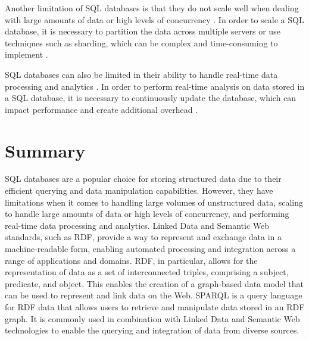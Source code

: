 Another limitation of SQL databases is that they do not scale well when dealing with large amounts of data or high levels of concurrency \citep{kleppmann2019designing,chen2014data}.  In order to scale a SQL database, it is necessary to partition the data across multiple servers or use techniques such as sharding, which can be complex and time-consuming to implement \citep{ramez2016fundamentals}.

SQL databases can also be limited in their ability to handle real-time data processing and analytics \citep{kleppmann2019designing,chen2014data}.  In order to perform real-time analysis on data stored in a SQL database, it is necessary to continuously update the database, which can impact performance and create additional overhead \citep{garcia2008database}.

\section{Summary}

SQL databases are a popular choice for storing structured data due to their efficient querying and data manipulation capabilities.  However, they have limitations when it comes to handling large volumes of unstructured data, scaling to handle large amounts of data or high levels of concurrency, and performing real-time data processing and analytics.  Linked Data and Semantic Web standards, such as RDF, provide a way to represent and exchange data in a machine-readable form, enabling automated processing and integration across a range of applications and domains.  RDF, in particular, allows for the representation of data as a set of interconnected triples, comprising a subject, predicate, and object.  This enables the creation of a graph-based data model that can be used to represent and link data on the Web.  SPARQL is a query language for RDF data that allows users to retrieve and manipulate data stored in an RDF graph.  It is commonly used in combination with Linked Data and Semantic Web technologies to enable the querying and integration of data from diverse sources.
